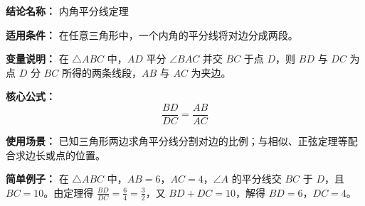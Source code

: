 \textbf{结论名称：} 内角平分线定理

\textbf{适用条件：} 在任意三角形中，一个内角的平分线将对边分成两段。

\textbf{变量说明：} 在 $\triangle ABC$ 中，$AD$ 平分 $\angle BAC$ 并交 $BC$ 于点 $D$，则 $BD$ 与 $DC$ 为点 $D$ 分 $BC$ 所得的两条线段，$AB$ 与 $AC$ 为夹边。

\textbf{核心公式：} \[ \boxed{\frac{BD}{DC} = \frac{AB}{AC}} \]

\textbf{使用场景：} 已知三角形两边求角平分线分割对边的比例；与相似、正弦定理等配合求边长或点的位置。

\textbf{简单例子：} 在 $\triangle ABC$ 中，$AB=6$，$AC=4$，$\angle A$ 的平分线交 $BC$ 于 $D$，且 $BC=10$。由定理得 $\frac{BD}{DC}=\frac{6}{4}=\frac{3}{2}$，又 $BD+DC=10$，解得 $BD=6$，$DC=4$。